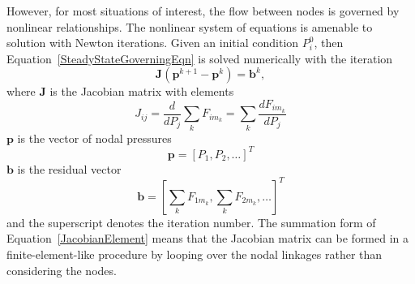 \documentclass[10pt]{report}
\newcommand{\eqnref}[1]{Equation~\ref{#1}}
\newcommand{\mat}[1]{\ensuremath{\mathbf{#1}}}
\begin{document}
However, for most situations of interest, the flow between nodes is governed by nonlinear relationships. The nonlinear system of equations is amenable to solution with Newton iterations. Given an initial condition $P_i^0$, then Equation~\ref{SteadyStateGoverningEqn} is solved numerically with the iteration
\begin{equation}
\mat{J}(\mathbf{p}^{k+1}-\mathbf{p}^{k}) = \mathbf{b}^k,
\end{equation}
where $\mat{J}$ is the Jacobian matrix with elements
\begin{equation}\label{JacobianElement}
J_{ij} = \frac{d}{dP_j}\sum_k F_{im_k}
       = \sum_k \frac{dF_{im_k}}{dP_j}
\end{equation}
$\mathbf{p}$ is the vector of nodal pressures
\begin{equation}
\mathbf{p} = [P_1, P_2, \dots]^T
\end{equation}
$\mathbf{b}$ is the residual vector
\begin{equation}
\mathbf{b} = \left[\sum_k F_{1m_k},
 \sum_k F_{2m_k}, \dots\right]^T
\end{equation}
and the superscript denotes the iteration number. The summation form of
\eqnref{JacobianElement} means that the Jacobian matrix can be formed in a
finite-element-like procedure by looping over the nodal linkages rather than
considering the nodes.
\end{document}
